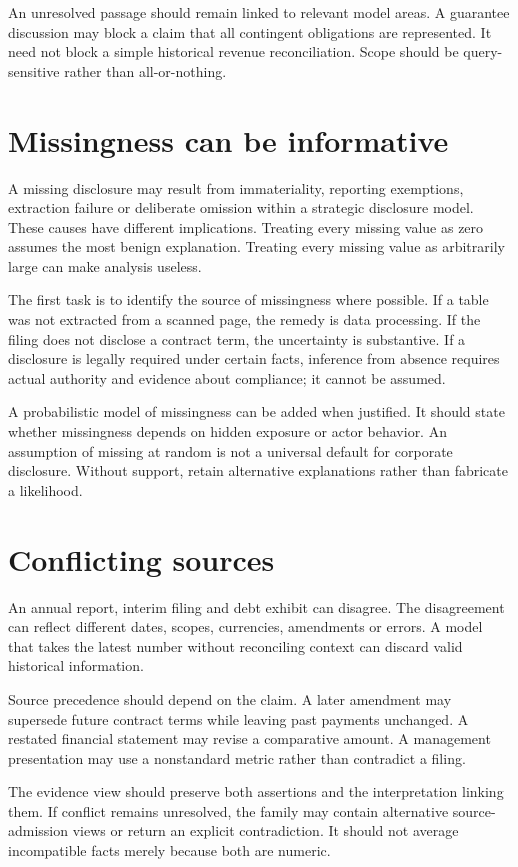 An unresolved passage should remain linked to relevant model areas. A guarantee discussion may block a claim that all contingent obligations are represented. It need not block a simple historical revenue reconciliation. Scope should be query-sensitive rather than all-or-nothing.

\section{Missingness can be informative}
A missing disclosure may result from immateriality, reporting exemptions, extraction failure or deliberate omission within a strategic disclosure model. These causes have different implications. Treating every missing value as zero assumes the most benign explanation. Treating every missing value as arbitrarily large can make analysis useless.

The first task is to identify the source of missingness where possible. If a table was not extracted from a scanned page, the remedy is data processing. If the filing does not disclose a contract term, the uncertainty is substantive. If a disclosure is legally required under certain facts, inference from absence requires actual authority and evidence about compliance; it cannot be assumed.

A probabilistic model of missingness can be added when justified. It should state whether missingness depends on hidden exposure or actor behavior. An assumption of missing at random is not a universal default for corporate disclosure. Without support, retain alternative explanations rather than fabricate a likelihood.

\section{Conflicting sources}
An annual report, interim filing and debt exhibit can disagree. The disagreement can reflect different dates, scopes, currencies, amendments or errors. A model that takes the latest number without reconciling context can discard valid historical information.

Source precedence should depend on the claim. A later amendment may supersede future contract terms while leaving past payments unchanged. A restated financial statement may revise a comparative amount. A management presentation may use a nonstandard metric rather than contradict a filing.

The evidence view should preserve both assertions and the interpretation linking them. If conflict remains unresolved, the family may contain alternative source-admission views or return an explicit contradiction. It should not average incompatible facts merely because both are numeric.

